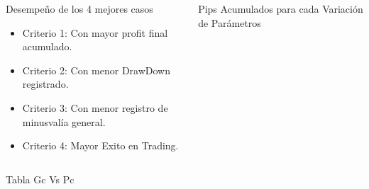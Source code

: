 \documentclass[final, xcolor=table]{beamer}\usepackage[]{graphicx}\usepackage[]{color}
\begin{document}
\begin{frame}
\begin{columns}[t]
\begin{column}{.32 \linewidth}
\begin{block}{\small Desempe\~no de los 4 mejores casos}


\small
\begin{itemize}
  \item Criterio 1: Con mayor profit final acumulado.
  \item Criterio 2: Con menor DrawDown registrado.
  \item Criterio 3: Con menor registro de minusval\'ia general.
  \item Criterio 4: Mayor Exito en Trading.
\end{itemize}

\end{block}
\end{column}


\begin{column}{.66 \linewidth}
\begin{block}{\small Pips Acumulados para cada Variaci\'on de Par\'ametros}

  
\end{block}
\end{column}

\end{columns}


\begin{columns}[t]


\begin{column}{.24 \linewidth}
\begin{block}{\small Tabla Gc Vs Pc }


\end{block}
\end{column}
\end{columns}
\end{frame}
\end{document}
